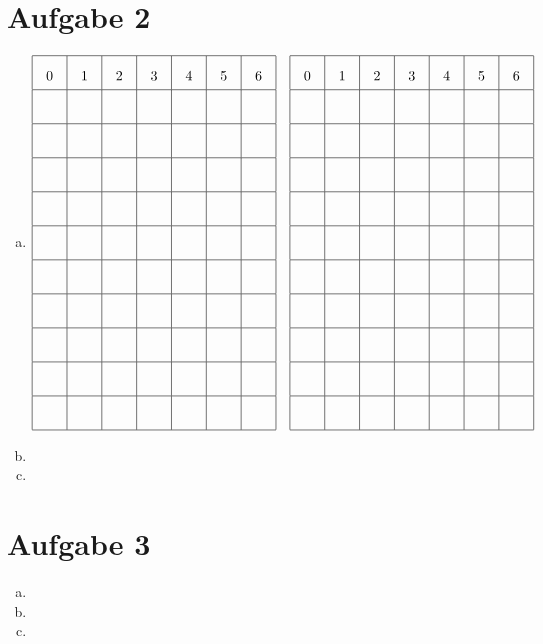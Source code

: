 \documentclass[a4paper,12pt]{scrartcl}
\begin{document}
\section*{Aufgabe 2}
\begin{enumerate}[a)]
	\item
    $$   
        \def\h#1{\parbox{1.5em}{\centering #1}}
        \renewcommand{\arraystretch}{2}
        \begin{array}{|c|*{6}{c|}}\hline
            \h0 & \h1 & \h2 & \h3 & \h4 & \h5 & \h6\\ \hline
            & & & & & & \\ \hline
            & & & & & & \\ \hline
            & & & & & & \\ \hline
            & & & & & & \\ \hline
            & & & & & & \\ \hline
            & & & & & & \\ \hline
            & & & & & & \\ \hline
            & & & & & & \\ \hline
            & & & & & & \\ \hline
            & & & & & & \\ \hline
        \end{array}
        \quad
        \begin{array}{|c|*{6}{c|}}\hline
            \h0 & \h1 & \h2 & \h3 & \h4 & \h5 & \h6\\ \hline
            & & & & & & \\ \hline
            & & & & & & \\ \hline
            & & & & & & \\ \hline
            & & & & & & \\ \hline
            & & & & & & \\ \hline
            & & & & & & \\ \hline
            & & & & & & \\ \hline
            & & & & & & \\ \hline
            & & & & & & \\ \hline
            & & & & & & \\ \hline
        \end{array}
    $$
	\item
	\item
\end{enumerate}


\section*{Aufgabe 3}
\begin{enumerate}[a)]
	\item 
	\item
	\item
\end{enumerate}
\end{document}
